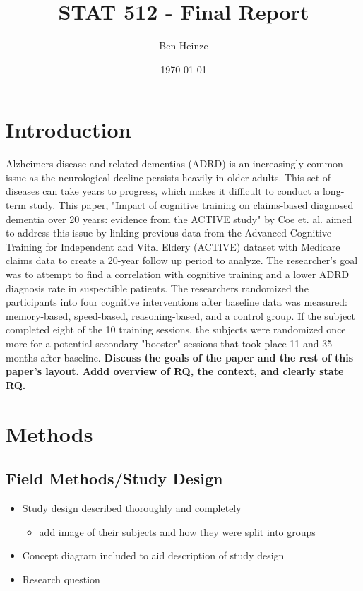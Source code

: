 \documentclass[11pt]{article}
\author{Ben Heinze}
\date{\today}
\title{STAT 512 - Final Report}
\begin{document}
\maketitle
\tableofcontents


\section{Introduction}
\label{sec:org60e19dd}

Alzheimers disease and related dementias (ADRD) is an increasingly common issue as the neurological decline persists heavily in older adults.
This set of diseases can take years to progress, which makes it difficult to conduct a long-term study.
This paper, "Impact of cognitive training on claims-based diagnosed dementia over 20 years: evidence from the ACTIVE study" by Coe et. al. aimed to address this issue by linking previous data from the Advanced Cognitive Training for Independent and Vital Eldery (ACTIVE) dataset with Medicare claims data to create a 20-year follow up period to analyze.
The researcher's goal was to attempt to find a correlation with cognitive training and a lower ADRD diagnosis rate in suspectible patients.
The researchers randomized the participants into four cognitive interventions after baseline data was measured: memory-based, speed-based, reasoning-based, and a control group.
If the subject completed eight of the 10 training sessions, the subjects were randomized once more for a potential secondary "booster" sessions that took place 11 and 35 months after baseline.
\textbf{\textbf{Discuss the goals of the paper and the rest of this paper's layout.}}
\textbf{\textbf{Addd overview of RQ, the context, and clearly state RQ.}}

\section{Methods}
\label{sec:orge195d07}

\subsection{Field Methods/Study Design}
\label{sec:orga99fc54}
\begin{itemize}
\item Study design described thoroughly and completely
\begin{itemize}
\item add image of their subjects and how they were split into groups
\end{itemize}
\item Concept diagram included to aid description of study design
\item Research question
\end{itemize}
\end{document}
